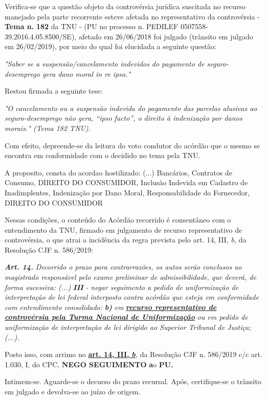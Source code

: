 \documentclass[12pt]{article}
\begin{document}
\justifying
\noindent Verifica-se que a questão objeto da controvérsia jurídica suscitada no recurso manejado pela parte recorrente esteve afetada no representativo da controvérsia - \textbf{Tema n. }\textbf{182} da TNU - (PU no processo n. PEDILEF 0507558-39.2016.4.05.8500/SE),  afetado em 26/06/2018 foi julgado (trânsito em julgado em 26/02/2019), por meio do qual foi elucidada a seguinte questão:

\noindent \textit{"Saber se a suspensão/cancelamento indevidos do pagamento de seguro-desemprego gera dano moral in re ipsa."}

\noindent Restou firmada a seguinte tese:

\noindent \textit{"O cancelamento ou a suspensão indevida do pagamento das parcelas alusivas ao seguro-desemprego não gera, “ipso facto”, o direito à indenização por danos morais." (Tema 182 TNU).}

\noindent Com efeito, depreende-se da leitura do voto condutor do acórdão que o mesmo se encontra em conformidade com o decidido no  tema pela TNU.

\noindent A proposito, consta do acordao hostilizado: (...) Bancários, Contratos de Consumo, DIREITO DO CONSUMIDOR, Inclusão Indevida em Cadastro de Inadimplentes, Indenização por Dano Moral, Responsabilidade do Fornecedor, DIREITO DO CONSUMIDOR

\noindent Nessas condições, o conteúdo do Acórdão recorrido é consentâneo com o entendimento da TNU, firmado em julgamento de recurso representativo de controvérsia, o que atrai a incidência da regra prevista pelo art. 14, III, \textit{b,} da Resolução CJF n. 586/2019:

\noindent \textit{\textbf{Art. 14.}}\textit{ Decorrido o prazo para contrarrazões, os autos serão conclusos ao magistrado responsável pelo exame preliminar de admissibilidade, que deverá, de forma sucessiva: (...) }\textit{\textbf{III }}\textit{- negar seguimento a pedido de uniformização de interpretação de lei federal interposto contra acórdão que esteja em conformidade com entendimento consolidado: }\textit{\textbf{b)}}\textit{ em }\uline{\textit{\textbf{recurso representativo de controvérsia pela Turma Nacional de Uniformização}}}\textit{ ou em pedido de uniformização de interpretação de lei dirigido ao Superior Tribunal de Justiça;(...).}

\noindent Posto isso, com arrimo no \uline{\textbf{art. 14, III, }}\uline{\textit{\textbf{b}}}\textit{,} da Resolução CJF n. 586/2019 c/c art. 1.030, I, do CPC, \textbf{NEGO SEGUIMENTO }\textbf{a}o\textbf{ PU}\textbf{.}

\noindent Intimem-se. Aguarde-se o decurso do prazo recursal. Após, certifique-se o trânsito em julgado e devolva-se ao juízo de origem.
\end{document}

